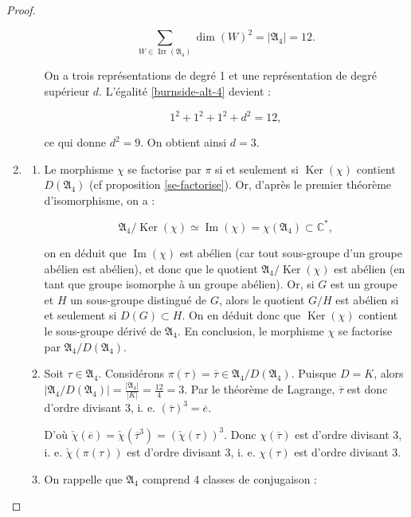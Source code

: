 \documentclass[french]{book}
\theoremstyle{definition}
\begin{document}
\begin{proof}
\begin{enumerate}
\begin{enumerate}
      \begin{equation}\label{burnside-alt-4}
        \sum_{W \in \operatorname{Irr}(\mathfrak{A}_4)} \operatorname{dim}(W)^2 = \left\lvert \mathfrak{A}_4 \right\rvert = 12.
      \end{equation}

      On a trois représentations de degré 1 et une représentation de degré supérieur \(d\). L'égalité \ref{burnside-alt-4} devient :

      \[1 ^2 + 1 ^2 + 1 ^2 + d ^2 = 12,\]

      ce qui donne \(d ^2 = 9\). On obtient ainsi \(d=3\).
    \end{enumerate}
    \item \begin{enumerate}
      \item Le morphisme \(\chi\) se factorise par \(\pi\) si et seulement si \(\operatorname{Ker}(\chi)\) contient \(D(\mathfrak{A}_4)\) (cf proposition \ref{se-factorise}). Or, d'après le premier théorème d'isomorphisme, on a :

      \[\mathfrak{A}_{4} / \operatorname{Ker}(\chi) \simeq \operatorname{Im}(\chi) = \chi(\mathfrak{A}_{4}) \subset \mathbb{C}^{*},\]

      on en déduit que \(\operatorname{Im}(\chi)\) est abélien (car tout sous-groupe d'un groupe abélien est abélien), et donc que le quotient \(\mathfrak{A}_{4} / \operatorname{Ker}(\chi)\) est abélien (en tant que groupe isomorphe à un groupe abélien).
      Or, si \(G\) est un groupe et \(H\) un sous-groupe distingué de \(G\), alors le quotient \(G / H\) est abélien si et seulement si \(D(G)\subset H\). On en déduit donc que \(\operatorname{Ker}(\chi)\) contient le sous-groupe dérivé de \(\mathfrak{A}_{4}\). En conclusion, le morphisme \(\chi\) se factorise par \(\mathfrak{A}_{4} / D(\mathfrak{A}_{4})\).
      \item Soit \(\tau \in \mathfrak{A}_{4}\). Considérons \(\pi(\tau) = \overline{\tau} \in \mathfrak{A}_{4}/D(\mathfrak{A}_{4})\). Puisque \(D=K\), alors \(\left\lvert \mathfrak{A}_{4}/ D(\mathfrak{A}_{4}) \right\rvert = \frac{\left\lvert \mathfrak{A}_{4} \right\rvert}{\left\lvert K \right\rvert} = \frac{12}{4}=3\).
      Par le théorème de Lagrange, \(\overline{\tau}\) est donc d'ordre divisant 3, i. e. \((\overline{\tau})^3 = \overline{e}\).

      D'où \(\check{\chi}(\overline{e}) = \check{\chi}(\overline{\tau}^{3}) = (\check{\chi}(\tau))^3\). Donc \(\chi(\overline{\tau})\) est d'ordre divisant 3, i. e. \(\check{\chi}(\pi(\tau))\) est d'ordre divisant 3, i. e. \(\chi(\tau)\) est d'ordre divisant 3.
      \item On rappelle que \(\mathfrak{A}_{4}\) comprend 4 classes de conjugaison :


\end{enumerate}
\end{enumerate}
\end{proof}
\end{document}
